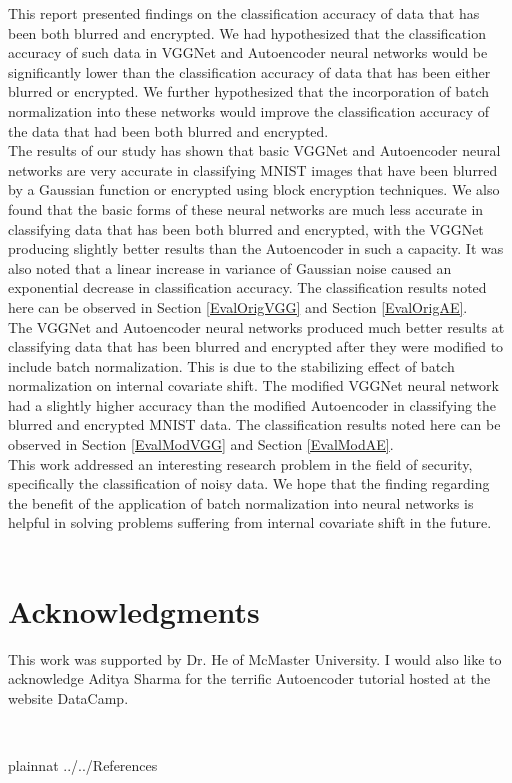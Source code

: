 \documentclass[12pt, titlepage]{article}
\begin{document}
\noindent This report presented findings on the classification accuracy of data that has been both blurred and encrypted. We had hypothesized that the classification accuracy of such data in VGGNet and Autoencoder neural networks would be significantly lower than the classification accuracy of data that has been either blurred or encrypted. We further hypothesized that the incorporation of batch normalization into these networks would improve the classification accuracy of the data that had been both blurred and encrypted.\\

\noindent The results of our study has shown that basic VGGNet and Autoencoder neural networks are very accurate in classifying MNIST images that have been blurred by a Gaussian function or encrypted using block encryption techniques. We also found that the basic forms of these neural networks are much less accurate in classifying data that has been both blurred and encrypted, with the VGGNet producing slightly better results than the Autoencoder in such a capacity. It was also noted that a linear increase in variance of Gaussian noise caused an exponential decrease in classification accuracy. The classification results noted here can be observed in Section \ref{EvalOrigVGG} and Section \ref{EvalOrigAE}.\\

\noindent The VGGNet and Autoencoder neural networks produced much better results at classifying data that has been blurred and encrypted after they were modified to include batch normalization. This is due to the stabilizing effect of batch normalization on internal covariate shift. The modified VGGNet neural network had a slightly higher accuracy than the modified Autoencoder in classifying the blurred and encrypted MNIST data. The classification results noted here can be observed in Section \ref{EvalModVGG} and Section \ref{EvalModAE}.\\

\noindent This work addressed an interesting research problem in the field of security, specifically the classification of noisy data. We hope that the finding regarding the benefit of the application of batch normalization into neural networks is helpful in solving problems suffering from internal covariate shift in the future.\\

~\newpage
\section{Acknowledgments}

This work was supported by Dr. He of McMaster University. I would also like to acknowledge Aditya Sharma for the terrific Autoencoder tutorial hosted at the website DataCamp.  


~\newpage

 {plainnat}
 {../../References}
\end{document}
